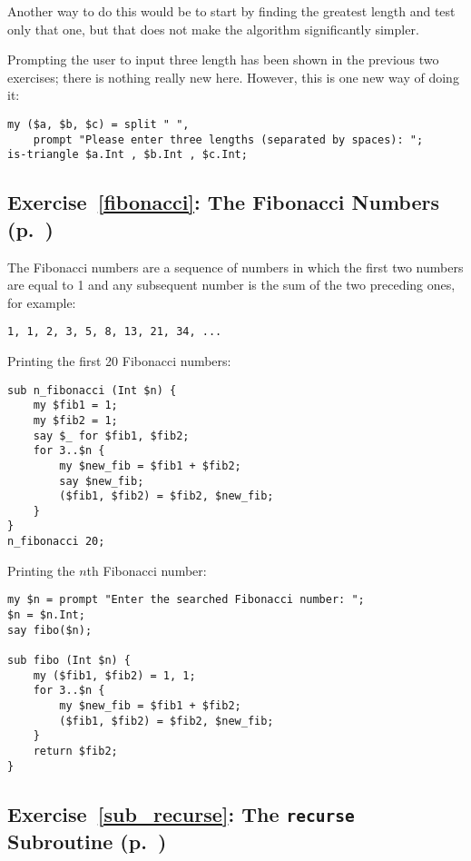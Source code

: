 Another way to do this would be to start by finding the greatest 
length and test only that one, but that does not make the 
algorithm significantly simpler.

Prompting the user to input three length has been shown in 
the previous two exercises; there is nothing really new here.
However, this is one new way of doing it:

\begin{verbatim}
my ($a, $b, $c) = split " ", 
    prompt "Please enter three lengths (separated by spaces): ";
is-triangle $a.Int , $b.Int , $c.Int;
\end{verbatim}


\subsection{Exercise~\ref{fibonacci}: The Fibonacci Numbers (p.~\pageref{fibonacci})}
\label{sol_fibonacci}

The Fibonacci numbers are a sequence of numbers in which the 
first two numbers are equal to 1 and any subsequent number is the 
sum of the two preceding ones, for example:
\begin{verbatim}
1, 1, 2, 3, 5, 8, 13, 21, 34, ...
\end{verbatim}

Printing the first 20 Fibonacci numbers:

\begin{verbatim}
sub n_fibonacci (Int $n) {
    my $fib1 = 1;
    my $fib2 = 1;
    say $_ for $fib1, $fib2;
    for 3..$n {
        my $new_fib = $fib1 + $fib2;
        say $new_fib;
        ($fib1, $fib2) = $fib2, $new_fib;
    }
}
n_fibonacci 20;
\end{verbatim}

Printing the $n$th Fibonacci number:

\begin{verbatim}
my $n = prompt "Enter the searched Fibonacci number: ";
$n = $n.Int;
say fibo($n);

sub fibo (Int $n) {
    my ($fib1, $fib2) = 1, 1;
    for 3..$n {
        my $new_fib = $fib1 + $fib2;
        ($fib1, $fib2) = $fib2, $new_fib;
    }
    return $fib2;
}    
\end{verbatim}

\subsection{Exercise~\ref{sub_recurse}: The {\tt recurse} Subroutine (p.~\pageref{sub_recurse})}
\label{sol_sub_recurse}

